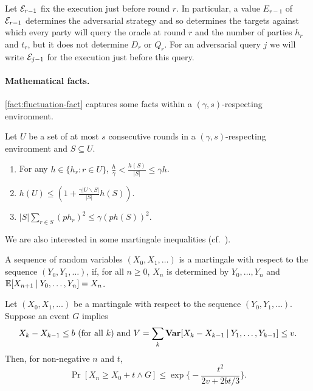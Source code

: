 Let $\mathcal{E}_{r - 1}$ fix the execution just before round $r$.
%
In particular, a value $E_{r - 1}$ of $\mathcal{E}_{r - 1}$ determines the adversarial strategy and so determines the targets against which every party will query the oracle at round $r$ and the number of parties $h_r$ and $t_r$, but it does not determine $D_r$ or $Q_r$.
%
For an adversarial query $j$ we will write $\mathcal{E}_{j - 1}$ for the execution just before this query.

\paragraph{Mathematical facts.}
%
\cref{fact:fluctuation-fact} captures some facts within a $(\gamma, s)$-respecting environment.

\begin{fact} \label{fact:fluctuation-fact}
    Let $U$ be a set of at most $s$ consecutive rounds in a $(\gamma, s)$-respecting environment and $S \subseteq U$.
    \begin{enumerate}[label=(\alph*), leftmargin=*, nosep]
        \item For any $h \in \{ h_r : r \in U\}$, $\frac{h}{\gamma} < \frac{h(S)}{|S|} \le \gamma h$.

        \item $h(U) \le (1 + \frac{\gamma |U \backslash S|}{|S|} h(S))$.

        \item $|S| \sum_{r \in S} (p h_r)^2 \le \gamma (p h(S))^2$.
    \end{enumerate}
\end{fact}

We are also interested in some martingale inequalities (cf.~\cite{C:GarKiaLeo17}).

\begin{definition} \label{def:martingale-sequence}
    A sequence of random variables $(X_0, X_1, \ldots)$ is a martingale with respect to the sequence $(Y_0, Y_1, \ldots)$, if, for all $n \ge 0$, $X_n$ is determined by $Y_0, \ldots , Y_n$ and $\mathbb{E} [X_{n + 1} \mathbin| Y_0, \ldots , Y_n] = X_n$.
\end{definition}

\begin{theorem} \label{thm:martingale-bound}
    Let $(X_0, X_1, \ldots)$ be a martingale with respect to the sequence $(Y_0, Y_1, \ldots)$.
    Suppose an event $G$ implies
    \[ X_k - X_{k - 1} \le b \text{ (for all $k$) and } V = \sum_k \mathbf{Var} [X_k - X_{k - 1} \mathbin| Y_1, \ldots, Y_{k - 1}] \le v. \]
    Then, for non-negative $n$ and $t$,
    \[ \Pr [X_n \ge X_0 + t \wedge G] \le \exp \Big\{ - \frac{t^2}{2v + 2bt / 3} \Big\}. \]
\end{theorem}

